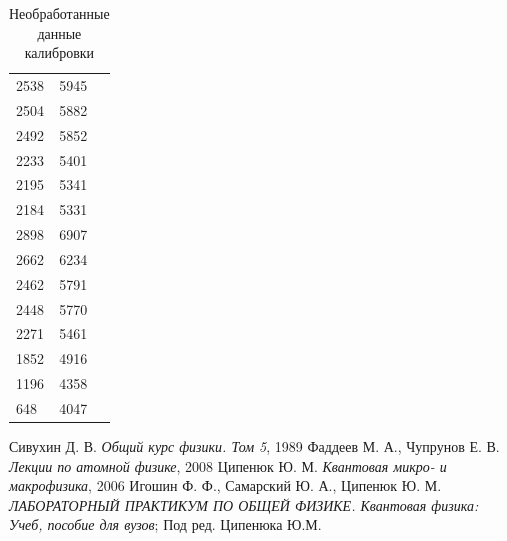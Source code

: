 \documentclass[a4paper]{article}
\begin{document}
\begin{table}[h]
\begin{tabular}{|l|l|l|}
		2538             & 5945                   &                         \\ \cline{1-2}
		2504             & 5882                   &                         \\ \cline{1-2}
		2492             & 5852                   &                         \\ \cline{1-2}
		2233             & 5401                   &                         \\ \cline{1-2}
		2195             & 5341                   &                         \\ \cline{1-2}
		2184             & 5331                   &                         \\ \cline{1-2}
		2898             & 6907                   &                         \\ \cline{1-2}
		2662             & 6234                   &                         \\ \cline{1-2}
		2462             & 5791                   &                         \\ \cline{1-2}
		2448             & 5770                   &                         \\ \cline{1-2}
		2271             & 5461                   &                         \\ \cline{1-2}
		1852             & 4916                   &                         \\ \cline{1-2}
		1196             & 4358                   &                         \\ \cline{1-2}
		648              & 4047                   &                         \\ \hline
	\end{tabular}
		\caption{Необработанные данные калибровки}
		\label{tab:raw}
	\end{table}
	
	\begin{thebibliography}{3}
		 Сивухин Д. В. \emph{Общий курс физики. Том 5}, 1989
		 Фаддеев М. А., Чупрунов Е. В. \emph{Лекции по атомной физике}, 2008
		 Ципенюк Ю. М. \emph{Квантовая микро- и макрофизика}, 2006
		 Игошин Ф. Ф., Самарский Ю. А., Ципенюк Ю. М. \emph{ЛАБОРАТОРНЫЙ ПРАКТИКУМ ПО ОБЩЕЙ ФИЗИКЕ. Квантовая физика: Учеб, пособие для вузов}; Под ред. Ципенюка Ю.М.
	\end{thebibliography}
\end{document}

